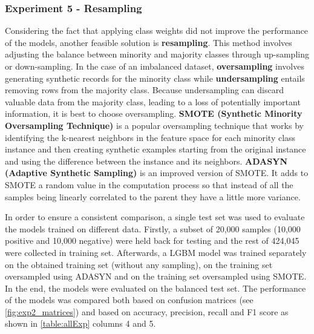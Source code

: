 \documentclass[runningheads]{llncs}
\begin{document}
\subsubsection{Experiment 5 - Resampling}
\label{section:exp_5}
Considering the fact that applying class weights did not improve the performance of the models, another feasible solution is \textbf{resampling}.
This method involves adjusting the balance between minority and majority classes through up-sampling or down-sampling. In the case of an imbalanced dataset, \textbf{oversampling} involves generating synthetic records for the minority class while \textbf{undersampling} entails removing rows from the majority class. 
Because undersampling can discard valuable data from the majority class, leading to a loss of potentially important information, it is best to choose oversampling. 
\textbf{SMOTE (Synthetic Minority Oversampling Technique)} 
\cite{smote2019}
is a popular oversampling technique that works by identifying the k-nearest neighbors in the feature space for each minority class instance and then creating synthetic examples starting from the original instance and using the difference between the instance and its neighbors. 
\textbf{ADASYN (Adaptive Synthetic Sampling)} 
\cite{adasyn2008}
is an improved version of SMOTE. It adds to SMOTE a random value in the computation process so that instead of all the samples being linearly correlated to the parent they have a little more variance. 

In order to ensure a consistent comparison, a single test set was used to evaluate the models trained on different data. Firstly, a subset of 20,000 samples (10,000 positive and 10,000 negative) were held back for testing and the rest of 424,045 were collected in training set. Afterwards, a LGBM model was trained separately on the obtained training set (without any sampling), on the training set oversampled using ADASYN and on the training set oversampled using SMOTE. In the end, the models were evaluated on the balanced test set. The performance of the models was compared both based on confusion matrices (see \autoref{fig:exp2_matrices}) and based on accuracy, precision, recall and F1 score as shown in \autoref{table:allExp} columns 4 and 5. 
\end{document}
